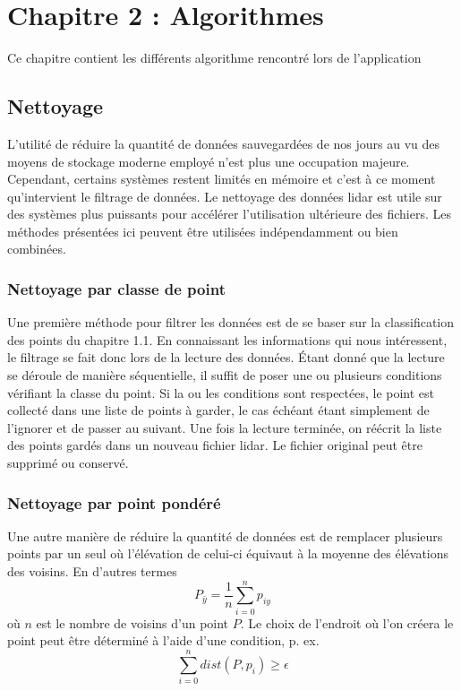 \chapter{Chapitre 2 : Algorithmes}

Ce chapitre contient les différents algorithme rencontré lors de l'application 

\section{Nettoyage}

L'utilité de réduire la quantité de données sauvegardées de nos jours au vu des 
moyens de stockage moderne employé n'est plus une occupation majeure.
Cependant, certains systèmes restent limités en mémoire et c'est à ce moment 
qu'intervient le filtrage de données.
Le nettoyage des données \gls{lidar} est utile sur des systèmes plus puissants
pour accélérer l'utilisation ultérieure des fichiers.
Les méthodes présentées ici peuvent être utilisées indépendamment ou bien combinées.

\subsection{Nettoyage par classe de point}

Une première méthode pour filtrer les données est de se baser sur la classification des points du chapitre 1.1. En connaissant les informations qui nous intéressent, le filtrage se fait donc lors de la lecture des données.
Étant donné que la lecture se déroule de manière séquentielle, il suffit de poser une ou plusieurs conditions vérifiant la classe du point.
Si la ou les conditions sont respectées, le point est collecté dans une liste de points à garder, le cas échéant étant simplement de l'ignorer et de passer au suivant.
Une fois la lecture terminée, on réécrit la liste des points gardés dans un nouveau fichier \gls{lidar}.
Le fichier original peut être supprimé ou conservé.

\subsection{Nettoyage par point pondéré}

Une autre manière de réduire la quantité de données est de remplacer plusieurs points par un seul où l'élévation de celui-ci équivaut à la moyenne des élévations des voisins.
En d'autres termes $$ P_{\bar{y}} = \frac{1}{n} \sum_{i=0}^{n} p_{iy} $$
où $n$ est le nombre de voisins d'un point $P$. 
Le choix de l'endroit où l'on créera le point peut être déterminé à l'aide d'une condition, p. ex. $$\sum_{i=0}^n dist(P, p_i) \geq \epsilon$$

